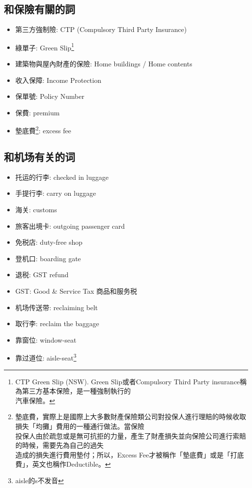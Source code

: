 \subsection{和保險有關的詞}
\begin{multicols}{2}
\begin{itemize}
  \itemsep0em
  \item 第三方強制險: CTP (Compulsory Third Party Insurance)
  \item 綠單子: Green Slip\footnote{CTP Green Slip (NSW). Green Slip或者Compulsory Third Party insurance稱為第三方基本保險，是一種強制執行的\\汽車保險。}
  \item 建築物與屋內財產的保險: Home buildings / Home contents
  \item 收入保障: Income Protection
  \item 保單號: Policy Number
  \item 保費: premium
  \item 墊底費\footnote{墊底費，實際上是國際上大多數財產保險類公司對投保人進行理賠的時候收取損失「均攤」費用的一種通行做法。當保險\\投保人由於疏忽或是無可抗拒的力量，產生了財產損失並向保險公司進行索賠的時候，需要先為自己的過失 \\ 造成的損失進行費用墊付；所以，Excess Fee才被稱作「墊底費」或是「打底費」，英文也稱作Deductible。}: excess fee
\end{itemize}
\end{multicols}

\subsection{和机场有关的词}
\begin{multicols}{2}
\begin{itemize}
  \itemsep0em
  \item 托运的行李: checked in luggage
  \item 手提行李: carry on luggage
  \item 海关: customs
  \item 旅客出境卡: outgoing passenger card
  \item 免税店: duty-free shop
  \item 登机口: boarding gate
  \item 退税: GST refund
  \item GST: Good \& Service Tax 商品和服务税
  \item 机场传送带: reclaiming belt
  \item 取行李: reclaim the baggage
  \item 靠窗位: window-seat
  \item 靠过道位: aisle-seat\footnote{aisle的s不发音}
\end{itemize}
\end{multicols}

